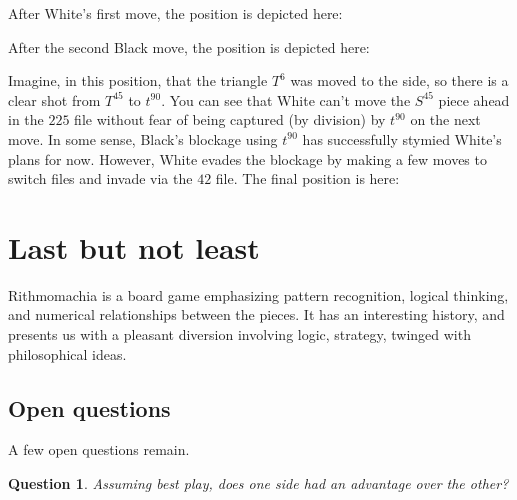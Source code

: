 \documentclass[12pt]{article}
\newtheorem{question}{Question}
\begin{document}
After White's first move, the position is depicted here:

\begin{center}
\end{center}
After the second Black move, the position is depicted here:

\begin{center}
\end{center}
Imagine, in this position, that the triangle $T^6$ was moved to the side, so there is a
clear shot from $T^{45}$ to $t^{90}$. 
You can see that White can't move the $S^{45}$ piece ahead in the {\bf $225$}
file without fear of being captured (by division) by $t^{90}$ on the next move.
In some sense, Black's blockage using $t^{90}$ has successfully stymied White's plans for now.
However, White evades the blockage by
making a few moves to switch files and invade via the $42$ file.
The final position is here:
\begin{center}
\end{center}


\section{Last but not least}


Rithmomachia is a board game emphasizing pattern recognition,
logical thinking, and numerical relationships between the pieces.
It has an interesting history, and presents us with
a pleasant diversion involving logic, strategy, twinged with philosophical
ideas.

\subsection{Open questions}

A few open questions remain.

\begin{question}
Assuming best play, does one side had an advantage over the other?
\end{question}  
\end{document}
